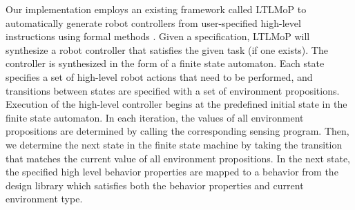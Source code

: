 \documentclass[conference]{IEEEtran}
\newcommand{\lt}{{\tt True }}
\begin{document}
Our implementation employs an existing framework called LTLMoP to automatically generate robot controllers from user-specified high-level instructions using formal methods \cite{DBLP:conf/iros/FinucaneJK10,DBLP:journals/trob/Kress-GazitFP09}.
Given a specification,  LTLMoP will synthesize a robot controller that satisfies the given  task (if one exists). The controller is synthesized in the form of a finite state automaton.
Each state specifies a set of high-level robot actions that need to be performed, and transitions between states are specified with a set of environment propositions.
Execution of the high-level controller begins at the predefined initial state in the finite state automaton. In each iteration, the values of all environment propositions are determined by calling the corresponding sensing program. Then, we determine the next state in the finite state machine by taking the transition that matches the current value of all environment propositions. 
In the next state, the specified high level behavior properties are mapped to a behavior from the design library which satisfies both the behavior properties and current environment type.


\end{document}
